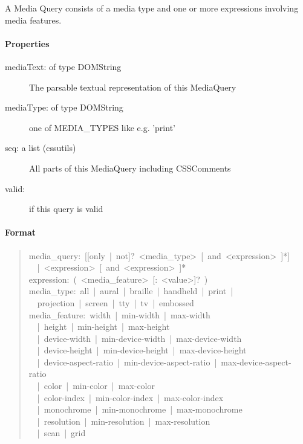 A Media Query consists of a media type and one or more
expressions involving media features.



\hypertarget{properties}{}
\paragraph*{Properties}
\label{properties}
\begin{description}
\item[{mediaText: of type DOMString}] \leavevmode 
The parsable textual representation of this MediaQuery

\item[{mediaType: of type DOMString}] \leavevmode 
one of MEDIA{\_}TYPES like e.g. 'print'

\item[{seq: a list (cssutils)}] \leavevmode 
All parts of this MediaQuery including CSSComments

\item[{valid:}] \leavevmode 
if this query is valid

\end{description}



\hypertarget{format}{}
\paragraph*{Format}
\label{format}
\begin{quote}{\ttfamily \raggedright \noindent
media{\_}query:~{[}{[}only~|~not{]}?~<media{\_}type>~{[}~and~<expression>~{]}*{]}~\\
~~|~<expression>~{[}~and~<expression>~{]}*~\\
expression:~(~<media{\_}feature>~{[}:~<value>{]}?~)~\\
media{\_}type:~all~|~aural~|~braille~|~handheld~|~print~|~\\
~~projection~|~screen~|~tty~|~tv~|~embossed~\\
media{\_}feature:~width~|~min-width~|~max-width~\\
~~|~height~|~min-height~|~max-height~\\
~~|~device-width~|~min-device-width~|~max-device-width~\\
~~|~device-height~|~min-device-height~|~max-device-height~\\
~~|~device-aspect-ratio~|~min-device-aspect-ratio~|~max-device-aspect-ratio~\\
~~|~color~|~min-color~|~max-color~\\
~~|~color-index~|~min-color-index~|~max-color-index~\\
~~|~monochrome~|~min-monochrome~|~max-monochrome~\\
~~|~resolution~|~min-resolution~|~max-resolution~\\
~~|~scan~|~grid
}\end{quote}

